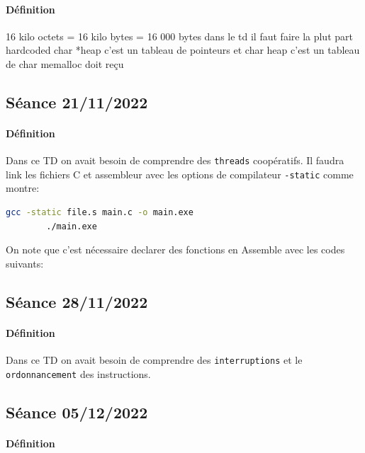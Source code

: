 \documentclass{article}
\begin{document}
\paragraph{Définition}16 kilo octets = 16 kilo bytes = 16 000 bytes
dans le td il faut faire la plut part hardcoded
char *heap c'est un tableau de pointeurs et char heap c'est un tableau de char
memalloc doit reçu

\newpage\subsection{Séance 21/11/2022}
\paragraph{Définition}Dans ce TD on avait besoin de comprendre des \texttt{threads} coopératifs. Il faudra link les fichiers C et assembleur avec les options de compilateur \texttt{-static} comme montre:
\begin{scriptsize}\mycode
    \begin{lstlisting}[language=Bash]
        gcc -static file.s main.c -o main.exe
        ./main.exe
    \end{lstlisting}
\end{scriptsize}
On note que c'est nécessaire declarer des fonctions en Assemble avec les codes suivants:
\begin{scriptsize}\mycode
    
\end{scriptsize}
\begin{scriptsize}\myRISCV
    
\end{scriptsize}

\newpage\subsection{Séance 28/11/2022}
\paragraph{Définition}Dans ce TD on avait besoin de comprendre des \texttt{interruptions} et le \texttt{ordonnancement} des instructions.
\begin{scriptsize}\mycode
    
\end{scriptsize}

\newpage\subsection{Séance 05/12/2022}
\paragraph{Définition}
\begin{scriptsize}\mycode
    
\end{scriptsize}
\end{document}
